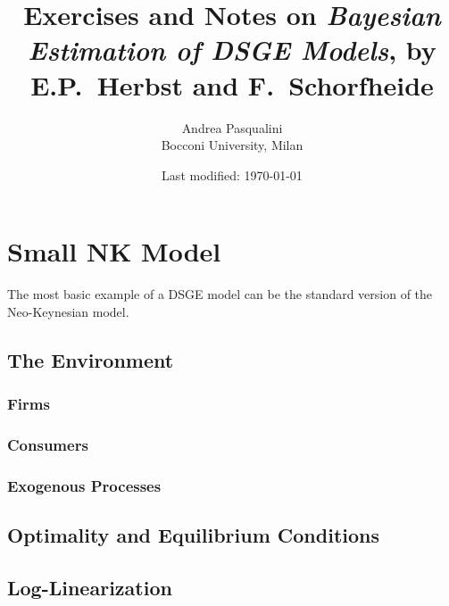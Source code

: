 \documentclass[a4paper,11pt]{article}
\author{
	Andrea Pasqualini \\
	Bocconi University, Milan
}
\title{
	Exercises and Notes on \emph{Bayesian Estimation of DSGE Models}, by E.P.~Herbst and F.~Schorfheide
}
\date{Last modified: \today}
\begin{document}
\maketitle

\section{Small NK Model}
	The most basic example of a DSGE model can be the standard version of the Neo-Keynesian model.

	\subsection{The Environment}
		\subsubsection{Firms}


		\subsubsection{Consumers}


		\subsubsection{Exogenous Processes}


	\subsection{Optimality and Equilibrium Conditions}


	\subsection{Log-Linearization}
\end{document}
